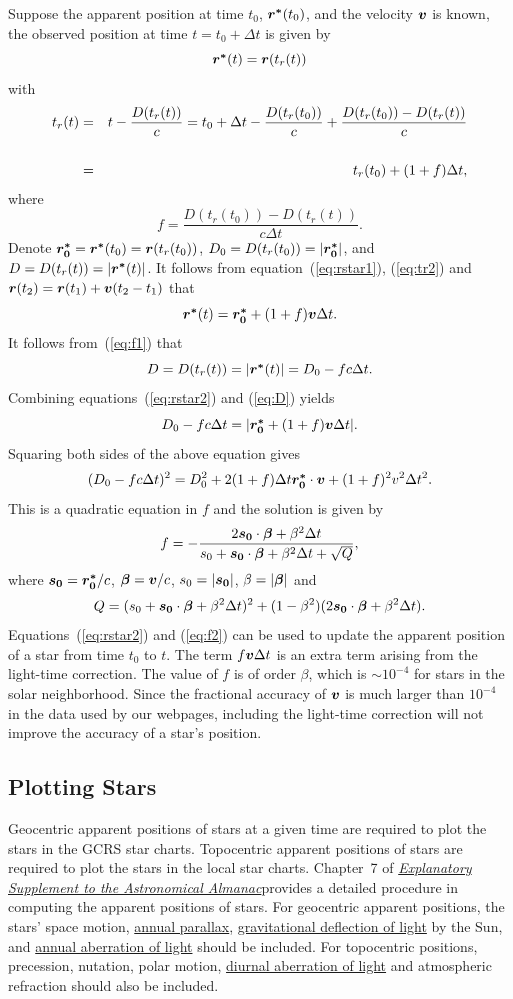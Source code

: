 \documentclass[12pt]{article}
\newcommand \beq {\begin{equation}}
\newcommand \eeq {\end{equation}}
\newcommand \beqn {\begin{eqnarray}}
\newcommand \eeqn {\end{eqnarray}}
\newcommand{\ve}[1]{\mbox{\boldmath $#1$}}
\newcommand{\expl}{\href{http://www.uscibooks.com/urban.htm}{\it Explanatory Supplement to the Astronomical Almanac}}
\begin{document}
Suppose the apparent position at time $t_0$, $\ve{r^*}(t_0)$, and the 
velocity $\ve{v}$ is known, the observed position at time $t=t_0+\Delta t$ 
is given by 
\beq
  \ve{r^*}(t) = \ve{r}(t_r(t))  
\label{eq:rstar1}
\eeq
with 
\beqn
  t_r(t) &=& t - \frac{D(t_r(t))}{c} = t_0 + \Delta t - \frac{D(t_r(t_0))}{c} 
+ \frac{D(t_r(t_0)) - D(t_r(t))}{c} \cr \cr
&=& t_r(t_0) + (1+f) \Delta t ,
\label{eq:tr2}
\eeqn
where 
\beq
  f = \frac{D(t_r(t_0))-D(t_r(t))}{c \Delta t} .
\label{eq:f1}
\eeq
Denote $\ve{r^*_0} = \ve{r^*}(t_0) = \ve{r}(t_r(t_0))$, 
$D_0 = D(t_r(t_0)) = |\ve{r^*_0}|$, 
and $D=D(t_r(t))=|\ve{r^*}(t)|$. It follows from equation~(\ref{eq:rstar1}), 
(\ref{eq:tr2}) and $\ve{r}(t_2) = \ve{r}(t_1) + \ve{v}(t_2-t_1)$ that 
\beq
  \ve{r^*}(t) = \ve{r^*_0} + (1+f)\ve{v} \Delta t .
\label{eq:rstar2}
\eeq
It follows from~(\ref{eq:f1}) that 
\beq
  D = D(t_r(t)) = |\ve{r^*}(t)| = D_0 - f c \Delta t .
\label{eq:D}
\eeq
Combining equations~(\ref{eq:rstar2}) and (\ref{eq:D}) yields 
\beq
  D_0 - f c \Delta t = |\ve{r^*_0} + (1+f)\ve{v} \Delta t| .
\eeq
Squaring both sides of the above equation gives 
\beq
  (D_0 - f c \Delta t)^2 = D_0^2 + 2(1+f)\Delta t \ve{r^*_0} \cdot \ve{v} 
+ (1+f)^2 v^2 \Delta t^2 .
\eeq
This is a quadratic equation in $f$ and the solution is given by 
\beq
  f = -\frac{2 \ve{s_0}\cdot \ve{\beta} + \beta^2 \Delta t}{s_0 + 
\ve{s_0}\cdot \ve{\beta} + \beta^2 \Delta t + \sqrt{Q}} ,
\label{eq:f2}
\eeq
where $\ve{s_0} = \ve{r^*_0}/c$, $\ve{\beta}=\ve{v}/c$, $s_0 = |\ve{s_0}|$, 
$\beta = |\ve{\beta}|$ and 
\beq
  Q = (s_0 + \ve{s_0}\cdot \ve{\beta} + \beta^2 \Delta t)^2 + 
(1-\beta^2)(2\ve{s_0}\cdot \ve{\beta} + \beta^2 \Delta t) .
\eeq
Equations~(\ref{eq:rstar2}) and (\ref{eq:f2}) can be used to update the 
apparent position of a star from time $t_0$ to $t$. The term $f\ve{v}\Delta t$ 
is an extra term arising from the light-time correction. The value of $f$ is 
of order $\beta$, which is $\sim 10^{-4}$ for stars in the solar neighborhood. 
Since the fractional accuracy of $\ve{v}$ is much larger than $10^{-4}$ in the 
data used by our webpages, including the light-time correction will not 
improve the accuracy of a star's position.

\subsection{Plotting Stars} 
\label{sec:plottingStars}

Geocentric apparent positions of stars at a given time are required to plot 
the stars in the GCRS star charts. Topocentric apparent positions of stars 
are required to plot the stars in the local star charts. 
Chapter~7 of \expl provides a detailed procedure in computing the apparent 
positions of stars. For geocentric apparent positions, the stars' 
space motion, \href{https://en.wikipedia.org/wiki/Parallax}{annual parallax}, 
\href{http://www.einstein-online.info/spotlights/light_deflection.html}{gravitational 
deflection of light} by the Sun, and \href{https://en.wikipedia.org/wiki/Aberration_of_light}
{annual aberration of light} should be included. 
For topocentric positions, precession, nutation, polar motion, 
\href{https://en.wikipedia.org/wiki/Aberration_of_light}
{diurnal aberration of light} and atmospheric refraction should also be included. 
\end{document}
